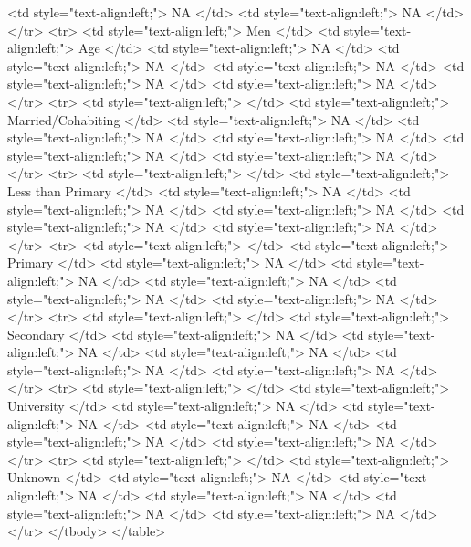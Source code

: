    <td style="text-align:left;"> NA </td>
   <td style="text-align:left;"> NA </td>
  </tr>
  <tr>
   <td style="text-align:left;"> Men </td>
   <td style="text-align:left;"> Age </td>
   <td style="text-align:left;"> NA </td>
   <td style="text-align:left;"> NA </td>
   <td style="text-align:left;"> NA </td>
   <td style="text-align:left;"> NA </td>
   <td style="text-align:left;"> NA </td>
  </tr>
  <tr>
   <td style="text-align:left;">  </td>
   <td style="text-align:left;"> Married/Cohabiting </td>
   <td style="text-align:left;"> NA </td>
   <td style="text-align:left;"> NA </td>
   <td style="text-align:left;"> NA </td>
   <td style="text-align:left;"> NA </td>
   <td style="text-align:left;"> NA </td>
  </tr>
  <tr>
   <td style="text-align:left;">  </td>
   <td style="text-align:left;"> Less than Primary </td>
   <td style="text-align:left;"> NA </td>
   <td style="text-align:left;"> NA </td>
   <td style="text-align:left;"> NA </td>
   <td style="text-align:left;"> NA </td>
   <td style="text-align:left;"> NA </td>
  </tr>
  <tr>
   <td style="text-align:left;">  </td>
   <td style="text-align:left;"> Primary </td>
   <td style="text-align:left;"> NA </td>
   <td style="text-align:left;"> NA </td>
   <td style="text-align:left;"> NA </td>
   <td style="text-align:left;"> NA </td>
   <td style="text-align:left;"> NA </td>
  </tr>
  <tr>
   <td style="text-align:left;">  </td>
   <td style="text-align:left;"> Secondary </td>
   <td style="text-align:left;"> NA </td>
   <td style="text-align:left;"> NA </td>
   <td style="text-align:left;"> NA </td>
   <td style="text-align:left;"> NA </td>
   <td style="text-align:left;"> NA </td>
  </tr>
  <tr>
   <td style="text-align:left;">  </td>
   <td style="text-align:left;"> University </td>
   <td style="text-align:left;"> NA </td>
   <td style="text-align:left;"> NA </td>
   <td style="text-align:left;"> NA </td>
   <td style="text-align:left;"> NA </td>
   <td style="text-align:left;"> NA </td>
  </tr>
  <tr>
   <td style="text-align:left;">  </td>
   <td style="text-align:left;"> Unknown </td>
   <td style="text-align:left;"> NA </td>
   <td style="text-align:left;"> NA </td>
   <td style="text-align:left;"> NA </td>
   <td style="text-align:left;"> NA </td>
   <td style="text-align:left;"> NA </td>
  </tr>
</tbody>
</table>
